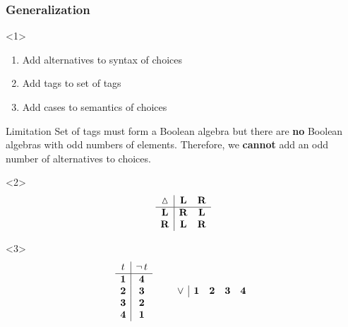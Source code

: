 \documentclass[draft,notes=show,xcolor=dvipsnames]{beamer}
\DeclareMathOperator{\Not}{\lnot}
\newcommand*{\vocab}[1]{\textbf{\textcolor{magenta}{#1}}}
\begin{document}
\begin{frame}
  \frametitle{Generalization}
  \begin{onlyenv}<1>
    \begin{enumerate}
      \item Add alternatives to syntax of choices
      \item Add tags to set of tags
      \item Add cases to semantics of choices
    \end{enumerate}
    \begin{alertblock}{Limitation}
      Set of tags must form a Boolean algebra but there are \textbf{no} Boolean algebras with odd numbers of elements.
      Therefore, we \textbf{cannot} add an odd number of alternatives to choices.
    \end{alertblock}
  \end{onlyenv}
  \begin{onlyenv}<2>
    $$
      \begin{array}{c|cc}
        \vartriangle & \tagL & \tagR \\
        \hline
        \tagL & \tagR & \tagL \\
        \tagR & \tagL & \tagR \\
      \end{array}
    $$
  \end{onlyenv}
  \note[item]<2>{$\tagE_1 \vartriangle \tagE_2 = (\tagE_1 \land \Not \tagE_2) \lor (\tagE_2 \land \Not \tagE_1)$}
  \note[item]<2>{$\vartriangle$ is \vocab{symmetric difference} (or \vocab{exclusive or})}
  \begin{onlyenv}<3>
    $$
      \begin{array}{c|c}
        \tagE & \Not \tagE \\
        \hline
        \tagLL & \tagRR \\
        \tagLR & \tagRL \\
        \tagRL & \tagLR \\
        \tagRR & \tagLL \\
      \end{array}
      \qquad
      \begin{array}{c|cccc}
        \lor & \tagLL & \tagLR & \tagRL & \tagRR \\

\end{array}$$
\end{onlyenv}
\end{frame}
\end{document}
